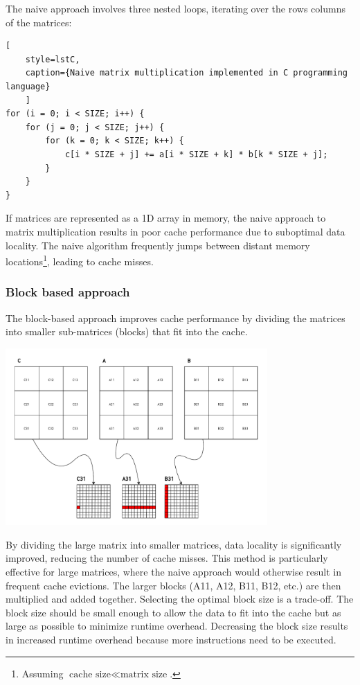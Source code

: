 The naive approach involves three nested loops, iterating over the rows columns of the matrices:

\begin{center}
\centering
\begin{minipage}{\linewidth}
\begin{lstlisting}[
	style=lstC,
    caption={Naive matrix multiplication implemented in C programming language}
    ]
for (i = 0; i < SIZE; i++) {
	for (j = 0; j < SIZE; j++) {
		for (k = 0; k < SIZE; k++) {
			c[i * SIZE + j] += a[i * SIZE + k] * b[k * SIZE + j];
		}
	}
}
\end{lstlisting}
\end{minipage}
\end{center}

\noindent If matrices are represented as a 1D array in memory, the naive approach to matrix multiplication results in poor cache performance due to suboptimal data locality.
The naive algorithm frequently jumps between distant memory locations\footnote{Assuming $\text{cache size} \ll \text{matrix size}$.}, leading to cache misses.

\subsubsection{Block based approach}
The block-based approach improves cache performance by dividing the matrices into smaller sub-matrices (blocks) that fit into the cache.

\begin{center}
	\centering
	\includegraphics[width=0.75\textwidth]{figures/05-analysis/mm_block.pdf}
	\label{fig:mm_block}
\end{center}

\noindent By dividing the large matrix into smaller matrices, data locality is significantly improved, reducing the number of cache misses. This method is particularly effective for
large matrices, where the naive approach would otherwise result in frequent cache evictions. The larger blocks (A11, A12, B11, B12, etc.) are then multiplied and added together.
Selecting the optimal block size is a trade-off. The block size should be small enough to allow the data to fit into the cache but as large as possible to minimize runtime
overhead. Decreasing the block size results in increased runtime overhead because more instructions need to be executed.

